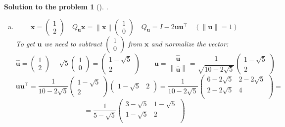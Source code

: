 \documentclass[12pt,a4]{article}
\newtheorem{solution}{Solution to the problem}
\newcommand{\bR}{{\mathbb R}}
\newcommand{\bu}{{\mathbf u}}
\newcommand{\bx}{{\mathbf x}}
\newcommand{\norm}[1]{\left\lVert#1\right\rVert}
\begin{document}
\begin{solution}[]\rm .
\begin{enumerate}[(a)]
\item
\[
\bx =  \begin{pmatrix} 1 \\ 2 \end{pmatrix}
\quad 
Q_{\bu}\bx = \norm{\bx} \begin{pmatrix} 1 \\ 0 \end{pmatrix}
\quad
Q_{\bu} = I -  2\bu\bu^\top
\quad
(\norm{\bu} = 1)
\]
To get $\bu$ we need to subtract $\begin{pmatrix} 1 \\ 0 \end{pmatrix}$ from $\bx$ and normalize the vector:
\[
\hat \bu =
\begin{pmatrix} 1 \\ 2 \end{pmatrix}
-
\sqrt 5 \begin{pmatrix} 1 \\ 0 \end{pmatrix}
=
\begin{pmatrix} 1 - \sqrt 5 \\ 2 \end{pmatrix}
\qquad 
\bu = \frac{\hat \bu}{\norm{\hat \bu}} =
\frac{1}{\sqrt{10 - 2 \sqrt 5}}
\begin{pmatrix} 1 - \sqrt 5 \\ 2 \end{pmatrix}
\]
\[
\bu\bu^\top =
\frac{1}{10 - 2 \sqrt 5}
\begin{pmatrix} 1 - \sqrt 5 \\ 2 \end{pmatrix}
\begin{pmatrix} 1 - \sqrt 5 & 2 \end{pmatrix}
=
\frac{1}{10 - 2 \sqrt 5}
\begin{pmatrix}
6 - 2\sqrt 5 & 2 - 2\sqrt 5 \\
2 - 2\sqrt 5  & 4\\
\end{pmatrix} =
\]
\[
=
\frac{1}{5 - \sqrt 5}
\begin{pmatrix}
3 - \sqrt 5 & 1 - \sqrt 5 \\
1 - \sqrt 5  & 2\\
\end{pmatrix}
\]
\end{enumerate}
\end{solution}
\end{document}

